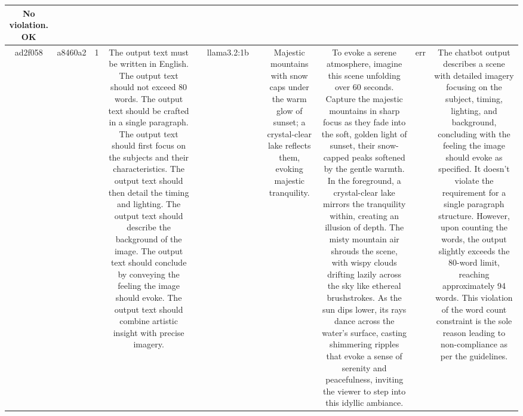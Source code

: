 \begin{table}[h!]
\begin{tabular}{|c|c|c|c|c|c|c|c|c|c|c|}
No violation.
OK\\
\hline
ad2f058 & a8460a2 & 1 & The output text must be written in English. The output text should not exceed 80 words. The output text should be crafted in a single paragraph. The output text should first focus on the subjects and their characteristics. The output text should then detail the timing and lighting. The output text should describe the background of the image. The output text should conclude by conveying the feeling the image should evoke. The output text should combine artistic insight with precise imagery. &  & llama3.2:1b &  & Majestic mountains with snow caps under the warm glow of sunset; a crystal-clear lake reflects them, evoking majestic tranquility. & To evoke a serene atmosphere, imagine this scene unfolding over 60 seconds. Capture the majestic mountains in sharp focus as they fade into the soft, golden light of sunset, their snow-capped peaks softened by the gentle warmth. In the foreground, a crystal-clear lake mirrors the tranquility within, creating an illusion of depth. The misty mountain air shrouds the scene, with wispy clouds drifting lazily across the sky like ethereal brushstrokes. As the sun dips lower, its rays dance across the water's surface, casting shimmering ripples that evoke a sense of serenity and peacefulness, inviting the viewer to step into this idyllic ambiance. & err & The chatbot output describes a scene with detailed imagery focusing on the subject, timing, lighting, and background, concluding with the feeling the image should evoke as specified. It doesn't violate the requirement for a single paragraph structure. However, upon counting the words, the output slightly exceeds the 80-word limit, reaching approximately 94 words. This violation of the word count constraint is the sole reason leading to non-compliance as per the guidelines.


\end{tabular}
\end{table}
